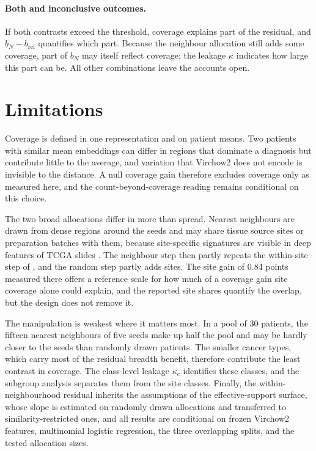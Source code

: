 \documentclass[11pt]{article}
\begin{document}
\paragraph{Both and inconclusive outcomes.}
If both contrasts exceed the threshold, coverage explains part of the residual, and $b_N-b_{\mathrm{ref}}$ quantifies which part. Because the neighbour allocation still adds some coverage, part of $b_N$ may itself reflect coverage; the leakage $\kappa$ indicates how large this part can be. All other combinations leave the accounts open.



\section{Limitations}
\label{sec:limitations}
Coverage is defined in one representation and on patient means. Two patients with similar mean embeddings can differ in regions that dominate a diagnosis but contribute little to the average, and variation that Virchow2 does not encode is invisible to the distance. A null coverage gain therefore excludes coverage only as measured here, and the count-beyond-coverage reading remains conditional on this choice.

The two broad allocations differ in more than spread. Nearest neighbours are drawn from dense regions around the seeds and may share tissue source sites or preparation batches with them, because site-specific signatures are visible in deep features of TCGA slides \citep{howard2021impact}. The neighbour step then partly repeats the within-site step of \citet{queisler2026siteCoverage}, and the random step partly adds sites. The site gain of 0.84 points measured there offers a reference scale for how much of a coverage gain site coverage alone could explain, and the reported site shares quantify the overlap, but the design does not remove it.

The manipulation is weakest where it matters most. In a pool of 30 patients, the fifteen nearest neighbours of five seeds make up half the pool and may be hardly closer to the seeds than randomly drawn patients. The smaller cancer types, which carry most of the residual breadth benefit, therefore contribute the least contrast in coverage. The class-level leakage $\kappa_c$ identifies these classes, and the subgroup analysis separates them from the site classes. Finally, the within-neighbourhood residual inherits the assumptions of the effective-support surface, whose slope is estimated on randomly drawn allocations and transferred to similarity-restricted ones, and all results are conditional on frozen Virchow2 features, multinomial logistic regression, the three overlapping splits, and the tested allocation sizes.



\end{document}
